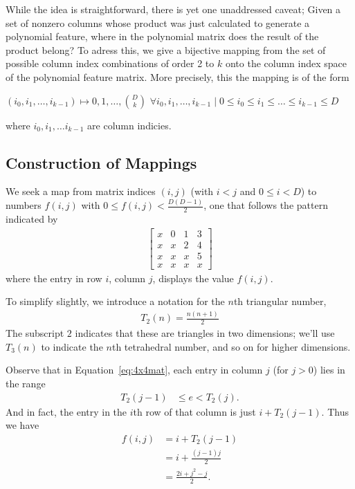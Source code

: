 \documentclass{article} %
\begin{document}
While the idea is straightforward, there is yet one unaddressed caveat; 
Given a set of nonzero columns whose product was just calculated to generate a polynomial feature, where in the polynomial matrix does the result of the product belong?
To adress this, we give a bijective mapping from the set of possible column index combinations of order 2 to $k$ onto the column index space of the polynomial feature matrix.
More precisely, this the mapping is of the form 

$(i_0, i_1, \dots, i_{k-1}) \mapsto {0,1,\dots, \binom{D}{k}}$ 
$\forall i_0, i_1, \dots, i_{k-1} \mid 0 \le i_0 \le i_1 \le \dots \le i_{k-1} \le D$

where $i_0,i_1,\dots i_{k-1}$ are column indicies.

\subsection{Construction of Mappings}

We seek a map from matrix indices $(i, j)$ (with $i < j$ and $0 \le i < D$) to numbers $f(i, j)$ with $0 \le f(i, j) < \frac{D(D-1)}{2}$, one that follows the pattern indicated by 
\begin{align}
\begin{bmatrix}
x & 0 & 1 & 3 \\
x & x & 2 & 4 \\
x & x & x & 5 \\
x & x & x & x
\end{bmatrix}
\label{eq:4x4mat}
\end{align}
where the entry in row $i$, column $j$, displays the value $f(i, j)$. 

To simplify slightly, we introduce a notation for the $n$th triangular number, 
\begin{align}
T_2(n) = \frac{n(n+1)}{2}
\end{align}
\noindent
The subscript $2$ indicates that these are triangles in two dimensions; we'll use $T_3(n)$ to indicate the $n$th tetrahedral number, and so on for higher dimensions. 

Observe that in Equation~\ref{eq:4x4mat}, each entry in column $j$ (for $j > 0$) lies in the range
\begin{align}
T_2(j-1) &\le e < T_2(j).
\end{align}
\noindent
And in fact, the entry in the $i$th row of that column is just $i + T_2(j-1)$. Thus we have
\begin{align}
f(i, j) 
&= i + T_2(j-1)\\
&= i + \frac{(j-1)j}{2}\\
&=  \frac{2i + j^2-j}{2}.
\end{align}
\end{document}
